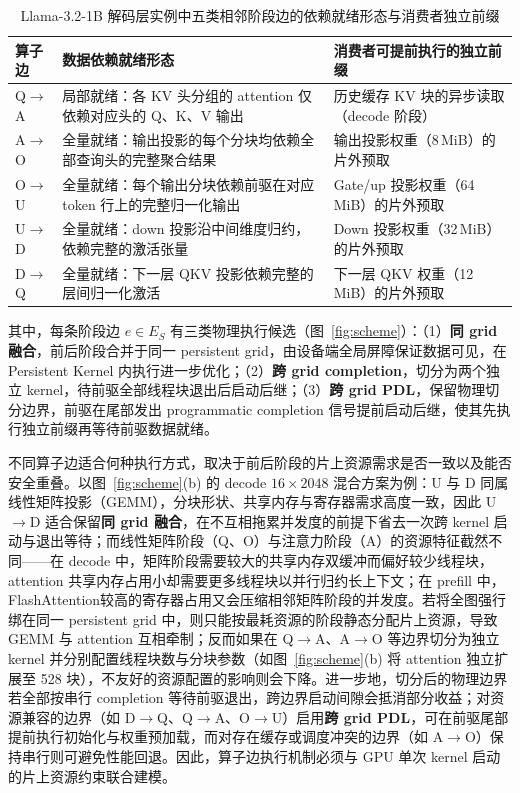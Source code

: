 \begin{table}[!htb]\centering
\caption{Llama-3.2-1B 解码层实例中五类相邻阶段边的依赖就绪形态与消费者独立前缀}\label{tab:edges}
\small
\begin{tabularx}{\textwidth}{@{}p{1.4cm}>{\raggedright\arraybackslash}p{6.5cm}>{\raggedright\arraybackslash}X@{}}
\toprule
算子边 & 数据依赖就绪形态 & 消费者可提前执行的独立前缀\\
\midrule
Q$\to$A & 局部就绪：各 KV 头分组的 attention 仅依赖对应头的 Q、K、V 输出 & 历史缓存 KV 块的异步读取（decode 阶段）\\
A$\to$O & 全量就绪：输出投影的每个分块均依赖全部查询头的完整聚合结果 & 输出投影权重（8\,MiB）的片外预取\\
O$\to$U & 全量就绪：每个输出分块依赖前驱在对应 token 行上的完整归一化输出 & Gate/up 投影权重（64\,MiB）的片外预取\\
U$\to$D & 全量就绪：down 投影沿中间维度归约，依赖完整的激活张量 & Down 投影权重（32\,MiB）的片外预取\\
D$\to$Q & 全量就绪：下一层 QKV 投影依赖完整的层间归一化激活 & 下一层 QKV 权重（12\,MiB）的片外预取\\
\bottomrule
\end{tabularx}
\end{table}
其中，每条阶段边 $e\in E_S$ 有三类物理执行候选（图~\ref{fig:scheme}）：（1）\textbf{同 grid 融合}，前后阶段合并于同一 persistent grid，由设备端全局屏障保证数据可见，在 Persistent Kernel 内执行进一步优化；（2）\textbf{跨 grid completion}，切分为两个独立 kernel，待前驱全部线程块退出后启动后继；（3）\textbf{跨 grid PDL}，保留物理切分边界，前驱在尾部发出 programmatic completion 信号提前启动后继，使其先执行独立前缀再等待前驱数据就绪。

不同算子边适合何种执行方式，取决于前后阶段的片上资源需求是否一致以及能否安全重叠。以图~\ref{fig:scheme}(b) 的 decode $16\times 2048$ 混合方案为例：U 与 D 同属线性矩阵投影（GEMM），分块形状、共享内存与寄存器需求高度一致，因此 U$\to$D 适合保留\textbf{同 grid 融合}，在不互相拖累并发度的前提下省去一次跨 kernel 启动与退出等待；而线性矩阵阶段（Q、O）与注意力阶段（A）的资源特征截然不同——在 decode 中，矩阵阶段需要较大的共享内存双缓冲而偏好较少线程块，attention 共享内存占用小却需要更多线程块以并行归约长上下文；在 prefill 中，FlashAttention较高的寄存器占用又会压缩相邻矩阵阶段的并发度。若将全图强行绑在同一 persistent grid 中，则只能按最耗资源的阶段静态分配片上资源，导致 GEMM 与 attention 互相牵制；反而如果在 Q$\to$A、A$\to$O 等边界切分为独立 kernel 并分别配置线程块数与分块参数（如图~\ref{fig:scheme}(b) 将 attention 独立扩展至 528 块），不友好的资源配置的影响则会下降。进一步地，切分后的物理边界若全部按串行 completion 等待前驱退出，跨边界启动间隙会抵消部分收益；对资源兼容的边界（如 D$\to$Q、Q$\to$A、O$\to$U）启用\textbf{跨 grid PDL}，可在前驱尾部提前执行初始化与权重预加载，而对存在缓存或调度冲突的边界（如 A$\to$O）保持串行则可避免性能回退。因此，算子边执行机制必须与 GPU 单次 kernel 启动的片上资源约束联合建模。

